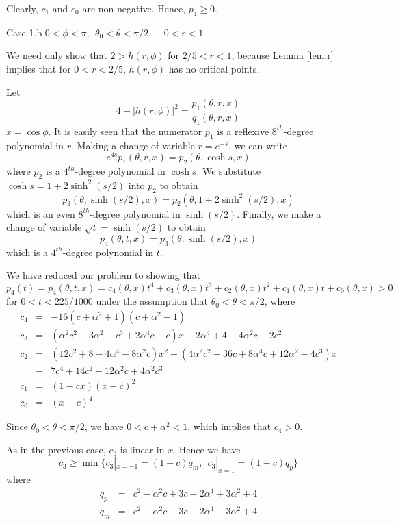\documentclass[12pt]{icgft}
\theoremstyle{definition}
\numberwithin{equation}{section}
\begin{document}
Clearly, $c_1$ and $c_0$ are non-negative.  Hence, $p_4 \ge 0$.

\vspace{0.1in}

Case 1.b $0 < \phi < \pi, \ \  \theta_0 < \theta < \pi/2$, \ \ $0 < r < 1$

\vspace{0.1in}

We need only show that $2 > h(r,\phi)$ for $2/5 < r < 1$, because Lemma  \ref{lem:r} implies that for $0 < r < 2/5$, $h(r,\phi)$ has no critical points.

Let
$$4 - |h(r,\phi)|^2 = \frac{p_1(\theta,r,x)}{q_1(\theta,r,x)}$$
\noindent $x = \cos \phi$.  It is easily seen that the numerator $p_1$ is a
reflexive $8^{th}$-degree polynomial in $r$.
Making a change of  variable $r=e^{-s}$, we can write
$$e^{4s}p_1(\theta,r,x) = p_2(\theta,\cosh s,x)$$
\noindent where $p_2$ is a $4^{th}$-degree polynomial in $\cosh s$. We substitute $\cosh s = 1 + 2 \sinh^2(s/2)$
into $p_2$ to obtain
$$ p_3(\theta,\sinh(s/2),x) = p_2(\theta,1 + 2 \sinh^2(s/2),x)$$
\noindent which is an even $8^{th}$-degree polynomial in $\sinh(s/2)$.  Finally, we
make a change of variable $\sqrt{t} = \sinh(s/2)$ to obtain
$$ p_4(\theta,t,x) = p_3(\theta,\sinh(s/2),x)$$
\noindent which is a $4^{th}$-degree polynomial in $t$.

We have reduced our problem to showing that
$$p_4(t) = p_4(\theta,t,x) = c_4(\theta,x)t^4 + c_3(\theta,x)t^3 + c_2(\theta,x)t^2 + c_1(\theta,x)t  + c_0(\theta,x) > 0$$
\noindent for $0 < t < 225/1000$ under the assumption that $\theta_0 < \theta < \pi/2$, where
\begin{eqnarray*}
c_4 &=& -16(c+\alpha^2+1)(c+\alpha^2-1) \\
c_3 &=& (\alpha^2c^2 + 3\alpha^2 - c^3 + 2\alpha^4c -c)x -2\alpha^4 + 4 - 4\alpha^2c-2c^2\\
c_2 &=& (12c^2+8-4\alpha^4-8\alpha^2c)x^2 +(4\alpha^2c^2-36c+8\alpha^4c+12\alpha^2-4c^3)x \\
 &-&7c^4 + 14c^2-12\alpha^2c+4\alpha^2c^3 \\
c_1 &=& (1-cx)(x-c)^2\\
c_0 &=& (x-c)^4
\end{eqnarray*}

Since $\theta_0 < \theta < \pi/2$, we have $0 < c+\alpha^2 < 1$, which implies that $c_4 > 0$.

\vspace{0.1in}

As in the previous case, $c_3$ is linear in $x$.  Hence we have
$$c_3 \ge \min \{ {c_3}|_{x=-1} = (1-c)q_m, \ \  {c_3}|_{x=1} = (1+c)q_p\}$$
\noindent where
\begin{eqnarray*}
q_p &=& c^2 - \alpha^2c+3c-2\alpha^4+3\alpha^2 + 4 \\
q_m &=& c^2-\alpha^2c-3c-2\alpha^4-3\alpha^2+4
\end{eqnarray*}
\end{document}
